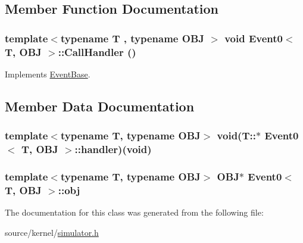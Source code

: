 \subsection{Member Function Documentation}
\hypertarget{classEvent0_77176d1040ed4cc48fa750c4854212b9}{
\subsubsection[{CallHandler}]{\setlength{\rightskip}{0pt plus 5cm}template$<$typename T , typename OBJ $>$ void {\bf Event0}$<$ T, OBJ $>$::CallHandler ()}}
\label{classEvent0_77176d1040ed4cc48fa750c4854212b9}




Implements \hyperlink{classEventBase_121ca64dec88c8d9589c064b0060d037}{EventBase}.

\subsection{Member Data Documentation}
\hypertarget{classEvent0_9f5c4b04f0f887ef7a2df146e10e9403}{
\subsubsection[{handler}]{\setlength{\rightskip}{0pt plus 5cm}template$<$typename T, typename OBJ$>$ void(T::$\ast$ {\bf Event0}$<$ T, OBJ $>$::{\bf handler})(void)}}
\label{classEvent0_9f5c4b04f0f887ef7a2df146e10e9403}


\hypertarget{classEvent0_b37236e93d14993e36a8913ae2dbaf31}{
\subsubsection[{obj}]{\setlength{\rightskip}{0pt plus 5cm}template$<$typename T, typename OBJ$>$ OBJ$\ast$ {\bf Event0}$<$ T, OBJ $>$::{\bf obj}}}
\label{classEvent0_b37236e93d14993e36a8913ae2dbaf31}




The documentation for this class was generated from the following file:\begin{CompactItemize}
\item 
source/kernel/\hyperlink{simulator_8h}{simulator.h}\end{CompactItemize}
